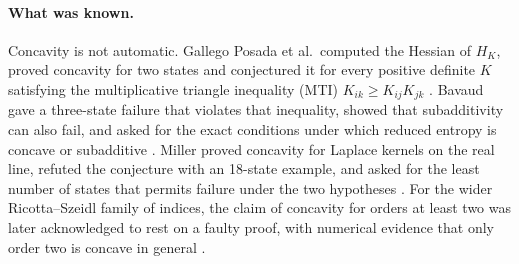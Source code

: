 \documentclass[11pt,a4paper]{article}
\theoremstyle{remark}
\begin{document}
\paragraph{What was known.} Concavity is not automatic. Gallego Posada et al.\ computed the Hessian of $H_K$, proved concavity for two states and conjectured it for every positive definite $K$ satisfying the multiplicative triangle inequality (MTI) $K_{ik}\ge K_{ij}K_{jk}$ \cite[Conjecture 1 and Supplement C]{gait}. Bavaud gave a three-state failure that violates that inequality, showed that subadditivity can also fail, and asked for the exact conditions under which reduced entropy is concave or subadditive \cite[Section 6]{bavaud}. Miller proved concavity for Laplace kernels on the real line, refuted the conjecture with an 18-state example, and asked for the least number of states that permits failure under the two hypotheses \cite[Section 6.2 and Appendix E]{miller}. For the wider Ricotta--Szeidl family of indices, the claim of concavity for orders at least two \cite[Theorem 2]{rs} was later acknowledged to rest on a faulty proof, with numerical evidence that only order two is concave in general \cite{rsp}.
\end{document}
